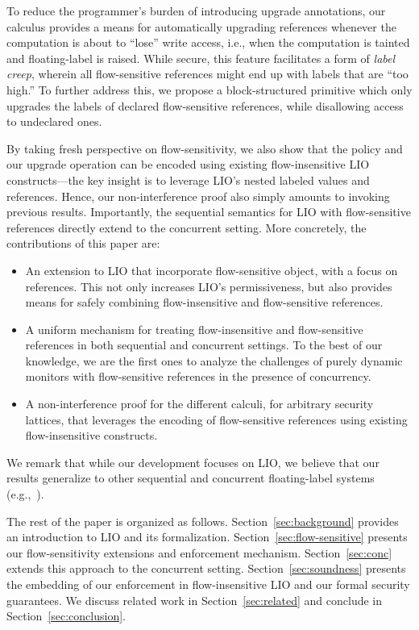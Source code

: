 To reduce the programmer's burden of introducing upgrade annotations,
our calculus provides a means for automatically upgrading references
whenever the computation is about to ``lose'' write access, i.e.,
when the computation is tainted and floating-label is raised.
%
While secure, this feature facilitates a form of \emph{label creep},
wherein all flow-sensitive references might end up with labels that
are ``too high.''
%
To further address this, we propose a block-structured primitive which
only upgrades the labels of declared flow-sensitive references, while
disallowing access to undeclared ones.
 
By taking fresh perspective on flow-sensitivity, we also show that the
{\nsu} policy and our upgrade operation can be encoded using existing
flow-insensitive LIO constructs---the key insight is to leverage LIO's
nested labeled values and references.
%
Hence, our non-interference proof also simply amounts to invoking
previous results.
%
Importantly, the sequential semantics for LIO with flow-sensitive
references directly extend to the concurrent setting.
%
More concretely, the contributions of this paper are:
\begin{itemize}

\item An extension to LIO that incorporate flow-sensitive object,
  with a focus on references. This not only increases LIO's
  permissiveness, but also provides means for safely combining
  flow-insensitive and flow-sensitive references.

\item A uniform mechanism for treating flow-insensitive and flow-sensitive
  references in both sequential and concurrent settings. To the best of our
  knowledge, we are the first ones to analyze the challenges of purely dynamic
  monitors with flow-sensitive references in the presence of concurrency.

\item A non-interference proof for the different calculi, for
  arbitrary security lattices, that leverages the encoding of
  flow-sensitive references using existing flow-insensitive constructs.
\end{itemize}
%
We remark that while our development focuses on LIO, we believe that
our results generalize to other sequential and concurrent
floating-label systems (e.g.,~\cite{Breeze, Efstathopoulos:2005,
zeldovich:histar, krohn:flume}).

The rest of the paper is organized as
follows. Section~\ref{sec:background} provides an introduction to LIO
and its formalization.  Section~\ref{sec:flow-sensitive} presents our
flow-sensitivity extensions and enforcement
mechanism. Section~\ref{sec:conc} extends this approach to the
concurrent setting. Section~\ref{sec:soundness} presents the embedding
of our enforcement in flow-insensitive LIO and our formal security guarantees.
We discuss related work in Section~\ref{sec:related} and conclude in
Section~\ref{sec:conclusion}.


